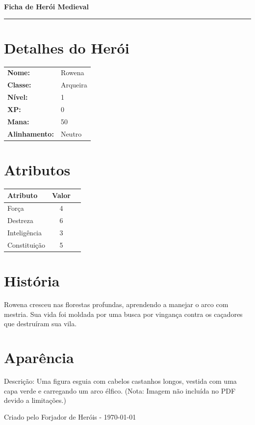 \documentclass[a4paper,12pt]{article}
\begin{document}
\begin{center}
    \textcolor{medievalgold}{\Huge\textbf{Ficha de Herói Medieval}} \\
    \vspace{0.5cm}
    \rule{\textwidth}{1pt} %
\end{center}

\section*{Detalhes do Herói}
\begin{tabular}{p{3cm} p{10cm}}
    \textbf{Nome:} & Rowena \\
    \textbf{Classe:} & Arqueira \\
    \textbf{Nível:} & 1 \\
    \textbf{XP:} & 0 \\
    \textbf{Mana:} & 50 \\
    \textbf{Alinhamento:} & Neutro \\
\end{tabular}

\section*{Atributos}
\begin{tabular}{l c c}
    \toprule
    \textbf{Atributo} & \textbf{Valor} \\
    \midrule
    Força & 4 \\
    Destreza & 6 \\
    Inteligência & 3 \\
    Constituição & 5 \\
    \bottomrule
\end{tabular}

\section*{História}
Rowena cresceu nas florestas profundas, aprendendo a manejar o arco com mestria. Sua vida foi moldada por uma busca por vingança contra os caçadores que destruíram sua vila.

\section*{Aparência}
Descrição: Uma figura esguia com cabelos castanhos longos, vestida com uma capa verde e carregando um arco élfico. (Nota: Imagem não incluída no PDF devido a limitações.)

\vspace{1cm}
\begin{center}
    \textcolor{medievaldark}{\small Criado pelo Forjador de Heróis - \today}
\end{center}
\end{document}
